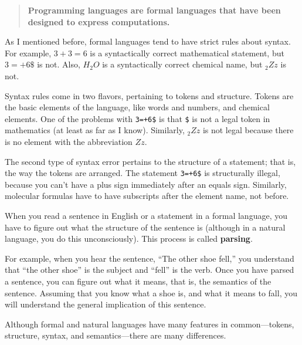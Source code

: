 \begin{quote}
{\bf Programming languages are formal languages that have been
designed to express computations.}
\end{quote}

As I mentioned before, formal languages tend to have strict rules
about syntax.  For example, $3+3=6$ is a syntactically correct
mathematical statement, but $3=+6\$$ is not.  Also, $H_2O$ is a
syntactically correct chemical name, but $_2Zz$ is not.

Syntax rules come in two flavors, pertaining to tokens and structure.
Tokens are the basic elements of the language, like words and numbers, and chemical elements.  One of the problems with {\tt 3=+6\$} is that
{\tt \$} is not a legal token in mathematics (at least as far as I
know).  Similarly, $_2Zz$ is not legal because there is no element with
the abbreviation $Zz$.

The second type of syntax error pertains to the structure of a statement; that is, the way the tokens are arranged.  The statement
{\tt 3=+6\$} is structurally illegal, because you can't have a plus
sign immediately after an equals sign.  Similarly, molecular formulas
have to have subscripts after the element name, not before.

When you read a sentence in English or a statement in a formal
language, you have to figure out what the structure of the sentence is
(although in a natural language, you do this unconsciously).  This
process is called {\bf parsing}.


For example, when you hear the sentence, ``The other shoe fell,'' you
understand that ``the other shoe'' is the subject and ``fell'' is the
verb.  Once you have parsed a sentence, you can figure out what it
means, that is, the semantics of the sentence.  Assuming that you know
what a shoe is, and what it means to fall, you will understand the
general implication of this sentence.

Although formal and natural languages have many features in
common---tokens, structure, syntax, and semantics---there are many
differences.


